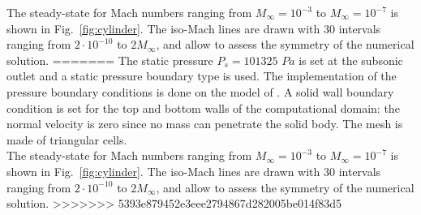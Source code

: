 \documentclass[preprint,10pt]{elsarticle}
\newcommand{\fig}[1]{Fig.~\ref{#1}}                      %
\begin{document}
The steady-state for Mach numbers ranging from $M_{\infty} = 10^{-3}$ to $M_{\infty} = 10^{-7}$ is shown in \fig{fig:cylinder}. The iso-Mach lines are drawn with $30$ intervals ranging from $2 \cdot 10^{-10}$ to $2M_{\infty}$, and allow to assess the symmetry of the numerical solution.
=======
The static pressure $P_s = 101325$ $Pa$ is set at the subsonic outlet and a static pressure boundary type is used. The implementation of the pressure boundary conditions is done on the model of \cite{SEM}. A solid wall boundary condition is set for the top and bottom walls of the computational domain: the normal velocity is zero since no mass can penetrate the solid body. The mesh is made of triangular cells.\\
The steady-state for Mach numbers ranging from $M_\infty = 10^{-3}$ to $M_\infty = 10^{-7}$ is shown in \fig{fig:cylinder}. The iso-Mach lines are drawn with $30$ intervals ranging from $2 \cdot 10^{-10}$ to $2M_\infty$, and allow to assess the symmetry of the numerical solution.
>>>>>>> 5393e879452e3eee2794867d282005be014f83d5
\end{document}
